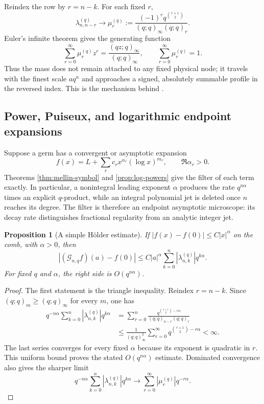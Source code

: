 \documentclass[11pt,a4paper,oneside]{article}
\newtheorem{proposition}[proposition]{Proposition}
\theoremstyle{definition}
\theoremstyle{remark}
\newcommand{\Gop}{\mathcal G}
\begin{document}
Reindex the row by $r=n-k$.  For each fixed $r$,
\begin{equation}
 \lambda_{n,n-r}^{(q)}
 \longrightarrow
 \mu_r^{(q)}
 :=\frac{(-1)^rq^{\binom{r+1}{2}}}
 {(q;q)_\infty(q;q)_r}.
 \label{eq:limiting-row-profile}
\end{equation}
Euler's infinite theorem gives the generating function
\begin{equation}
 \sum_{r=0}^\infty\mu_r^{(q)}z^r
 =\frac{(qz;q)_\infty}{(q;q)_\infty},
 \qquad
 \sum_{r=0}^\infty\mu_r^{(q)}=1.
 \label{eq:limiting-profile-generating}
\end{equation}
Thus the mass does not remain attached to any fixed physical node; it travels
with the finest scale $aq^n$ and approaches a signed, absolutely summable
profile in the reversed index.  This is the mechanism behind
.

\subsection{Power, Puiseux, and logarithmic endpoint expansions}

Suppose a germ has a convergent or asymptotic expansion
\[
 f(x)=L+\sum_{r}c_rx^{\alpha_r}(\log x)^{m_r},
 \qquad \Re\alpha_r>0.
\]
Theorems \ref{thm:mellin-symbol} and \ref{prop:log-powers} give the filter of
each term exactly.  In particular, a nonintegral leading exponent $\alpha$
produces the rate $q^{n\alpha}$ times an explicit $q$-product, while an
integral polynomial jet is deleted once $n$ reaches its degree.  The filter is
therefore an endpoint asymptotic microscope: its decay rate distinguishes
fractional regularity from an analytic integer jet.

\begin{proposition}[A simple Hölder estimate]
\label{prop:holder-filter}
If $|f(x)-f(0)|\le C|x|^\alpha$ on the comb, with $\alpha>0$, then
\begin{equation}
 |(\Gop_{n,q}f)(a)-f(0)|
 \le C|a|^\alpha
 \sum_{k=0}^n|\lambda_{n,k}^{(q)}|q^{k\alpha}.
 \label{eq:holder-bound}
\end{equation}
For fixed $q$ and $\alpha$, the right side is $O(q^{n\alpha})$.
\end{proposition}

\begin{proof}
The first statement is the triangle inequality.  Reindex $r=n-k$.  Since
$(q;q)_m\ge(q;q)_\infty$ for every $m$, one has
\begin{align*}
 q^{-n\alpha}
 \sum_{k=0}^n|\lambda_{n,k}^{(q)}|q^{k\alpha}
 &=\sum_{r=0}^n
 \frac{q^{\binom{r+1}{2}-r\alpha}}
 {(q;q)_{n-r}(q;q)_r}\\
 &\le \frac1{(q;q)_\infty^2}
 \sum_{r=0}^\infty q^{\binom{r+1}{2}-r\alpha}<\infty.
\end{align*}
The last series converges for every fixed $\alpha$ because its exponent is
quadratic in $r$.  This uniform bound proves the stated $O(q^{n\alpha})$
estimate.  Dominated convergence also gives the sharper limit
\[
 q^{-n\alpha}
 \sum_{k=0}^n|\lambda_{n,k}^{(q)}|q^{k\alpha}
 \longrightarrow
 \sum_{r=0}^\infty|\mu_r^{(q)}|q^{-r\alpha}.
\]
\end{proof}
\end{document}
